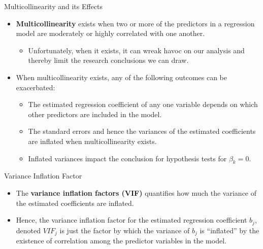 \documentclass[
  ignorenonframetext,
]{beamer}
\providecommand{\tightlist}{%
  \setlength{\itemsep}{0pt}\setlength{\parskip}{0pt}}
\begin{document}
\begin{frame}{Multicollinearity and its Effects}
\label{multicollinearity-and-its-effects}
\begin{itemize}
\item
  \textbf{Multicollinearity} exists when two or more of the predictors
  in a regression model are moderately or highly correlated with one
  another.

  \begin{itemize}
  \tightlist
  \item
    Unfortunately, when it exists, it can wreak havoc on our analysis
    and thereby limit the research conclusions we can draw.
  \end{itemize}
\item
  When multicollinearity exists, any of the following outcomes can be
  exacerbated:

  \begin{itemize}
  \tightlist
  \item
    The estimated regression coefficient of any one variable depends on
    which other predictors are included in the model.
  \item
    The standard errors and hence the variances of the estimated
    coefficients are inflated when multicollinearity exists.
  \item
    Inflated variances impact the conclusion for hypothesis tests for
    \(\beta_k = 0\).
  \end{itemize}
\end{itemize}
\end{frame}

\begin{frame}{Variance Inflation Factor}
\label{variance-inflation-factor}
\begin{itemize}
\item
  The \textbf{variance inflation factors (VIF)} quantifies how much the
  variance of the estimated coefficients are inflated.
\item
  Hence, the variance inflation factor for the estimated regression
  coefficient \(b_j\), denoted \(VIF_j\) is just the factor by which the
  variance of \(b_j\) is ``inflated'' by the existence of correlation
  among the predictor variables in the model.
\end{itemize}
\end{frame}
\end{document}
